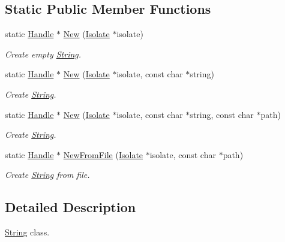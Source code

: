 \subsection*{Static Public Member Functions}
\begin{DoxyCompactItemize}
\item 
static \hyperlink{class_cobra_1_1_handle}{Handle} $\ast$ \hyperlink{class_cobra_1_1_string_af8ac2ad148e892bbb2ecefacfe546f2c}{New} (\hyperlink{class_cobra_1_1_isolate}{Isolate} $\ast$isolate)
\begin{DoxyCompactList}\small\item\em Create empty \hyperlink{class_cobra_1_1_string}{String}. \end{DoxyCompactList}\item 
static \hyperlink{class_cobra_1_1_handle}{Handle} $\ast$ \hyperlink{class_cobra_1_1_string_a55cafde773ca167f74c3e46350ce2a8c}{New} (\hyperlink{class_cobra_1_1_isolate}{Isolate} $\ast$isolate, const char $\ast$string)
\begin{DoxyCompactList}\small\item\em Create \hyperlink{class_cobra_1_1_string}{String}. \end{DoxyCompactList}\item 
static \hyperlink{class_cobra_1_1_handle}{Handle} $\ast$ \hyperlink{class_cobra_1_1_string_a7918cb5c8905dc47f329479d33b9dba7}{New} (\hyperlink{class_cobra_1_1_isolate}{Isolate} $\ast$isolate, const char $\ast$string, const char $\ast$path)
\begin{DoxyCompactList}\small\item\em Create \hyperlink{class_cobra_1_1_string}{String}. \end{DoxyCompactList}\item 
static \hyperlink{class_cobra_1_1_handle}{Handle} $\ast$ \hyperlink{class_cobra_1_1_string_a9aecd3ec0cdcabbb65cee5aa720528fc}{New\+From\+File} (\hyperlink{class_cobra_1_1_isolate}{Isolate} $\ast$isolate, const char $\ast$path)
\begin{DoxyCompactList}\small\item\em Create \hyperlink{class_cobra_1_1_string}{String} from file. \end{DoxyCompactList}\end{DoxyCompactItemize}


\subsection{Detailed Description}
\hyperlink{class_cobra_1_1_string}{String} class. 

